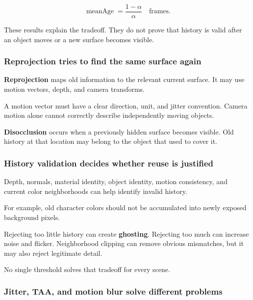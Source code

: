 \[
\operatorname{meanAge}=\frac{1-\alpha}{\alpha}
\quad\text{frames}.
\]

These results explain the tradeoff. They do not prove that history is valid after an object moves or a new surface becomes visible.

\subsubsection{Reprojection tries to find the same surface again}\label{04-visual-computing-ii-ch043-reprojection-tries-to-find-the-same-surface-again}

\hypertarget{04-visual-computing-ii-ch043-reprojection-tries-to-find-the-same-surface-again}{}

\textbf{Reprojection} maps old information to the relevant current surface. It may use motion vectors, depth, and camera transforms.

A motion vector must have a clear direction, unit, and jitter convention. Camera motion alone cannot correctly describe independently moving objects.

\textbf{Disocclusion} occurs when a previously hidden surface becomes visible. Old history at that location may belong to the object that used to cover it.

\subsubsection{History validation decides whether reuse is justified}\label{04-visual-computing-ii-ch043-history-validation-decides-whether-reuse-is-justified}

\hypertarget{04-visual-computing-ii-ch043-history-validation-decides-whether-reuse-is-justified}{}

Depth, normals, material identity, object identity, motion consistency, and current color neighborhoods can help identify invalid history.

For example, old character colors should not be accumulated into newly exposed background pixels.

Rejecting too little history can create \textbf{ghosting}. Rejecting too much can increase noise and flicker. Neighborhood clipping can remove obvious mismatches, but it may also reject legitimate detail.

No single threshold solves that tradeoff for every scene.

\subsubsection{Jitter, TAA, and motion blur solve different problems}\label{04-visual-computing-ii-ch043-jitter-taa-and-motion-blur-solve-different-problems}

